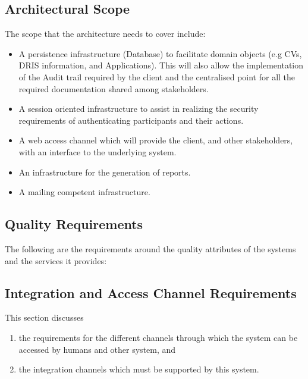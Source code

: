 \documentclass[12pt]{article}
\begin{document}
\subsection{Architectural Scope}
The scope that the architecture needs to cover include:
\begin{itemize}
\item A persistence infrastructure (Database) to facilitate domain objects (e.g CVs, DRIS information, and Applications). This will also allow the implementation of the Audit trail required by the client and the centralised point for all the required documentation shared among stakeholders.
\item A session oriented infrastructure to assist in realizing the security requirements of authenticating participants and their actions.
\item A web access channel which will provide the client, and other stakeholders, with an interface to the underlying system.
\item An infrastructure for the generation of reports.
\item A mailing competent infrastructure.
\end{itemize}

\subsection{Quality Requirements} 
\vspace{0.2in}
The following are the requirements around the quality attributes of the systems and the services it provides:



\subsection{Integration and Access Channel Requirements}
This section discusses 
\begin{enumerate}
\item the requirements for the different channels through which the system can be accessed by humans and other system, and
\item the integration channels which must be supported by this system.
\end{enumerate}
\end{document}
